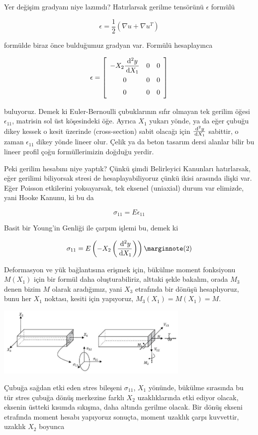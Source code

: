 \documentclass[12pt,fleqn]{article}\usepackage{../../common}
\begin{document}
Yer değişim gradyanı niye lazımdı? Hatırlarsak gerilme tensörünü $\epsilon$
formülü

$$
\epsilon = \frac{1}{2} (\nabla u + \nabla u^T )
$$

formülde biraz önce bulduğumuz gradyan var. Formülü hesaplayınca 

$$
\renewcommand*{\arraystretch}{1.5}
\epsilon = \left[\begin{array}{ccc}
-X_2 \dfrac{\ud^2 y}{\ud X_1} & 0 & 0 \\
0 & 0 & 0 \\
0 & 0 & 0 
\end{array}\right]
$$

buluyoruz. Demek ki Euler-Bernoulli çubuklarının sıfır olmayan tek gerilim öğesi
$\epsilon_{11}$, matrisin sol üst köşesindeki öğe. Ayrıca $X_1$ yukarı yönde, ya
da eğer çubuğu dikey kessek o kesit üzerinde (cross-section) sabit olacağı için
$\frac{\,\mathrm{d}^2 y}{\,\mathrm{d} X_1}$ sabittir, o zaman $\epsilon_{11}$ dikey yönde lineer
olur. Çelik ya da beton tasarım dersi alanlar bilir bu lineer profil çoğu
formüllerimizin doğduğu yerdir.

Peki gerilim hesabını niye yaptık? Çünkü şimdi Belirleyici Kanunları
hatırlarsak, eğer gerilimi biliyorsak stresi de hesaplayabiliyoruz çünkü ikisi
arasında ilişki var. Eğer Poisson etkilerini yoksayarsak, tek eksenel (uniaxial)
durum var elimizde, yani Hooke Kanunu, ki bu da

$$
\sigma_{11} = E \epsilon_{11}
$$

Basit bir Young'in Genliği ile çarpım işlemi bu, demek ki

$$
\sigma_{11} = E \left( -X_2 \left( \dfrac{\ud^2 y}{\ud X_1} \right) \right)
\mlabel{2}
$$

Deformasyon ve yük bağlantısına erişmek için, bükülme moment fonksiyonu $M(X_1)$ için
bir formül daha oluşturabiliriz, alttaki şekle bakalım, orada $M_3$ denen bizim
$M$ olarak aradığımız, yani $X_3$ etrafında bir dönüşü hesaplıyoruz, bunu her
$X_1$ noktası, kesiti için yapıyoruz, $M_3(X_1) = M(X_1) = M$.

\includegraphics[width=25em]{phy_020_strs_02_15.jpg}

Çubuğa sağdan etki eden stres bileşeni $\sigma_{11}$, $X_1$ yönünde, bükülme
sırasında bu tür stres çubuğa dönüş merkezine farklı $X_2$ uzaklıklarında etki
ediyor olacak, eksenin üstteki kısımda sıkışma, daha altında gerilme olacak. Bir
dönüş ekseni etrafında moment hesabı yapıyoruz sonuçta, moment uzaklık çarpı
kuvvettir, uzaklık $X_2$ boyunca
\end{document}

